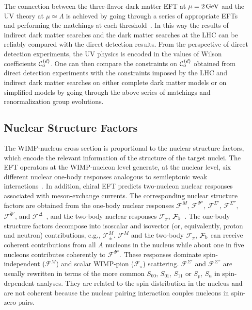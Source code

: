 The connection between the three-flavor dark matter EFT at $\mu =2\, \mathrm{GeV}$ and the UV theory at $\mu \simeq \Lambda$ is achieved by going through a series of appropriate EFTs and performing the matchings at each threshold~\cite{Crivellin:2014qxa,Brod:2018ust,Bishara:2018vix,DEramo:2014nmf,Crivellin:2014gpa}. In this way the results of indirect dark matter searches and the dark matter searches at the LHC can be reliably compared with the direct detection results. From the perspective of direct detection experiments, the UV physics is encoded in the values of Wilson coefficients ${\cal C}_a^{(d)}$. One can then compare the constraints on ${\cal C}_a^{(d)}$ obtained from direct detection experiments with the constraints imposed by the LHC and indirect dark matter searches on either complete dark matter models or on simplified models by going through the above series of matchings and renormalization group evolutions. 

\subsection{Nuclear Structure Factors}\label{sec:structure}

The WIMP-nucleus cross section is proportional to the nuclear structure factors, which encode the relevant information of the structure of the target nuclei. The EFT operators at the WIMP-nucleon level generate, at the nuclear level, six different nuclear one-body responses analogous to semileptonic weak interactions~\cite{Serot:1978vj,Donnelly:1979ezn,Serot:1979yk}. In addition, chiral EFT predicts two-nucleon nuclear responses associated with meson-exchange currents. The corresponding nuclear structure factors are obtained from the one-body nuclear responses $\mathcal{F}^M$, $\mathcal{F}^{\Phi ''}$, $\mathcal{F}^{\Sigma '}$, $\mathcal{F}^{\Sigma ''}$, $\mathcal{F}^{\tilde{\Phi} '}$, and $\mathcal{F}^{\Delta}$~\cite{Engel:1992bf,Anand:2013yka}, and the two-body nuclear responses $\mathcal{F}_{\pi}$, $\mathcal{F}_{\rm b}$~\cite{Hoferichter:2016nvd,Hoferichter:2018acd}. The one-body structure factors decompose into isoscalar and isovector (or, equivalently, proton and neutron) contributions, e.g., $\mathcal{F}^M_\pm$. $\mathcal{F}^M$ and the two-body $\mathcal{F}_{\pi}$, $\mathcal{F}_{\rm b}$ can receive coherent contributions from all $A$ nucleons in the nucleus while about one in five nucleons contributes coherently to $\mathcal{F}^{\Phi ''}$. These responses dominate spin-independent ($\mathcal{F}^M$) and scalar WIMP-pion ($\mathcal{F}_{\pi}$) scattering. $\mathcal{F}^{\Sigma '}$ and $\mathcal{F}^{\Sigma ''}$ are usually rewritten in terms of the more common $S_{00}$, $S_{01}$, $S_{11}$ or $S_p$, $S_n$ in spin-dependent analyses. They are related to the spin distribution in the nucleus and are not coherent because the nuclear pairing interaction couples nucleons in spin-zero pairs.

